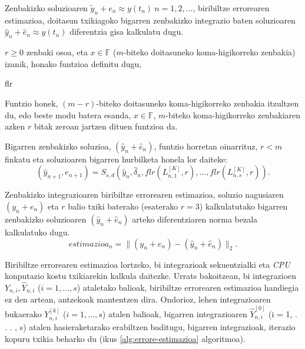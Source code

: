 Zenbakizko soluzioaren $\tilde{y}_n+e_n \approx y(t_n) \ n=1,2,\dots$, biribiltze errorearen estimazioa, doitasun txikiagoko  bigarren zenbakizko integrazio baten soluzioaren $\hat{y}_n+\hat{e}_n \approx y(t_n)$ diferentzia gisa kalkulatu dugu. 

$r\geqslant0$ zenbaki osoa, eta $x \in \mathbb{F}$ ($m$-biteko doitasuneko koma-higikorreko zenbakia) izanik, honako funtzioa definitu dugu,

\begin{algorithm}[H]
  \SetAlgoLined\DontPrintSemicolon
  \caption{flr}
\end{algorithm} 

Funtzio honek, $(m-r)$-biteko doitasuneko koma-higikorreko zenbakia itzultzen du, edo beste modu batera esanda, $x \in \mathbb{F}$, $m$-biteko koma-higikorreko zenbakiaren azken $r$ bitak zeroan jartzen dituen funtzioa da.

Bigarren zenbakizko soluzioa, $(\hat{y}_n+\hat{e}_{n})$, funtzio horretan oinarrituz, $r<m$ finkatu eta soluzioaren bigarren hurbilketa honela lor daiteke: 
\begin{equation*}
\label{eq:bkLn2}
(\hat y_{n+1}, e_{n+1}) = S_{s,d}(\hat y_n, \hat{\delta}_n, flr(L_{n,1}^{[K]},r), \dots,flr(L_{n,s}^{[K]},r)).
\end{equation*}

Zenbakizko integrazioaren biribiltze errorearen estimazioa, soluzio nagusiaren $(y_n+e_{n})$ eta $r$  balio txiki baterako (esaterako $r=3$) kalkulatutako bigarren zenbakizko soluzioaren $(\hat{y}_n+\hat{e}_{n})$ arteko diferentziaren norma bezala kalkulatuko dugu. 
\begin{equation}
estimazioa_n=\|(y_n+e_n)-(\hat{y}_n+\hat{e}_{n})\|_2.
\end{equation}

Biribiltze errorearen estimazioa lortzeko, bi integrazioak sekuentzialki eta \emph{CPU} konputazio kostu txikiarekin kalkula daitezke. Urrats bakoitzean, bi integrazioen $Y_{n,i},\hat{Y}_{n,i}$ ($i=1,\dots,s$) ataletako balioak, biribiltze errorearen estimazioa handiegia ez den artean, antzekoak mantentzen dira. Ondorioz, lehen integrazioaren bukaerako $Y_{n,i}^{[k]}$ ($i=1,\dots,s$) atalen balioak, bigarren integrazioaren $\hat{Y}_{n,i}^{[0]}$ (i = 1, . . . , s) atalen hasieraketarako erabiltzen baditugu, bigarren integrazioak, iterazio kopuru txikia beharko du (ikus \ref{alg:errore-estimazioa} algoritmoa).  

